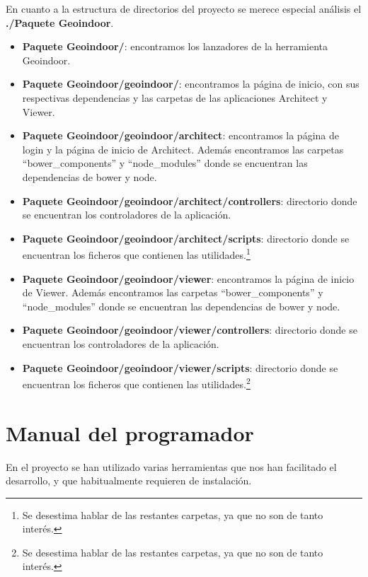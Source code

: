 En cuanto a la estructura de directorios del proyecto se merece especial análisis el \textbf{./Paquete Geoindoor}.

\begin{itemize}
	\item \textbf{Paquete Geoindoor/}: encontramos los lanzadores de la herramienta Geoindoor.
	\item \textbf{Paquete Geoindoor/geoindoor/}: encontramos la página de inicio, con sus respectivas dependencias y las carpetas de las aplicaciones Architect y Viewer.
	\item \textbf{Paquete Geoindoor/geoindoor/architect}: encontramos la página de login y la página de inicio de Architect. Además encontramos las carpetas ``bower\_components'' y ``node\_modules'' donde se encuentran las dependencias de bower y node.
	\item \textbf{Paquete Geoindoor/geoindoor/architect/controllers}: directorio donde se encuentran los controladores de la aplicación.
	\item \textbf{Paquete Geoindoor/geoindoor/architect/scripts}: directorio donde se encuentran los ficheros que contienen las utilidades.\footnote{Se desestima hablar de las restantes carpetas, ya que no son de tanto interés.}
	
	\item \textbf{Paquete Geoindoor/geoindoor/viewer}: encontramos la página de inicio de Viewer. Además encontramos las carpetas ``bower\_components'' y ``node\_modules'' donde se encuentran las dependencias de bower y node.
	\item \textbf{Paquete Geoindoor/geoindoor/viewer/controllers}: directorio donde se encuentran los controladores de la aplicación.
	\item \textbf{Paquete Geoindoor/geoindoor/viewer/scripts}: directorio donde se encuentran los ficheros que contienen las utilidades.\footnote{Se desestima hablar de las restantes carpetas, ya que no son de tanto interés.}
\end{itemize}


\section{Manual del programador}

En el proyecto se han utilizado varias herramientas que nos han facilitado el desarrollo, y que habitualmente requieren de instalación.

